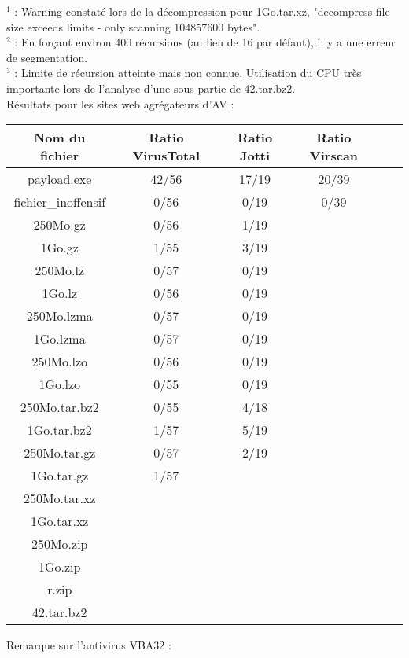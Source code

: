 \documentclass[smallextended]{svjour3}       %
\begin{document}
$^1$ : Warning constaté lors de la décompression pour 1Go.tar.xz, "decompress file size exceeds limits - only scanning 104857600 bytes".\\
$^2$ : En forçant environ 400 récursions (au lieu de 16 par défaut), il y a une erreur de segmentation.\\
$^3$ : Limite de récursion atteinte mais non connue. Utilisation du CPU très importante lors de l'analyse d'une sous partie de 42.tar.bz2.
$ $\\
Résultats pour les sites web agrégateurs d'AV :\\
\begin{tabular}{|*{6}{c|}}
    \hline
\textbf{Nom du fichier} & \textbf{Ratio VirusTotal} & \textbf{Ratio Jotti} & \textbf{Ratio Virscan} \\
	\hline
payload.exe & 42/56 & 17/19 & 20/39\\
	\hline
fichier\_inoffensif & 0/56 & 0/19  & 0/39 \\
	\hline
	\hline
250Mo.gz & 0/56 & 1/19 & \\
	\hline
1Go.gz &  1/55  & 3/19 & \\
    \hline
    \hline
250Mo.lz & 0/57 & 0/19 & \\
	\hline
1Go.lz & 0/56 & 0/19 & \\
    \hline
    \hline
250Mo.lzma & 0/57 & 0/19 & \\
	\hline
1Go.lzma & 0/57 & 0/19 & \\
    \hline
    \hline
250Mo.lzo & 0/56 & 0/19 & \\
	\hline
1Go.lzo & 0/55 & 0/19 & \\
    \hline
    \hline
250Mo.tar.bz2 & 0/55 & 4/18 & \\
	\hline
1Go.tar.bz2 & 1/57 & 5/19 & \\
    \hline
    \hline
250Mo.tar.gz & 0/57 & 2/19 & \\
	\hline
1Go.tar.gz & 1/57 &  & \\
    \hline
    \hline
250Mo.tar.xz &  &  & \\
	\hline
1Go.tar.xz &  &  & \\
    \hline
    \hline
250Mo.zip &  &  & \\
	\hline
1Go.zip &  &  & \\
    \hline
    \hline
r.zip &  &  & \\
	\hline
42.tar.bz2 &  &  & \\
	\hline
\end{tabular}
$ $\\
Remarque sur l'antivirus VBA32 :\\
\end{document}
